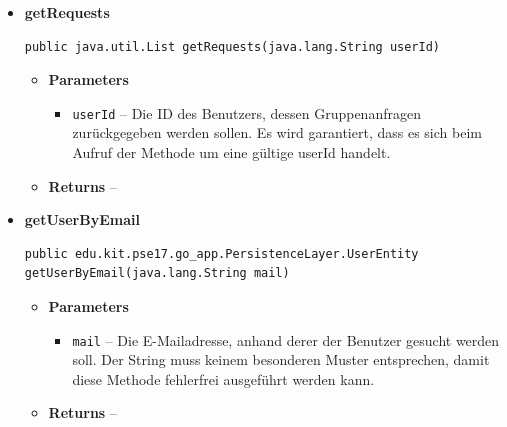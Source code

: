 \documentclass[11pt,a4paper]{article}
\begin{document}
{{{{{{{{{{{{{{{\begin{itemize}
{\begin{itemize}
{}%
\end{itemize}
}%
\item{ 
\hypertarget{edu.kit.pse17.go_app.PersistenceLayer.daos.UserDaoImp.getRequests(java.lang.String)}{{\bf  getRequests}\\}
\begin{lstlisting}[frame=none]
public java.util.List getRequests(java.lang.String userId)\end{lstlisting} %
\begin{itemize}
\item{
{\bf  Parameters}
  \begin{itemize}
   \item{
\texttt{userId} -- Die ID des Benutzers, dessen Gruppenanfragen zurückgegeben werden sollen. Es wird garantiert, dass es sich beim Aufruf der Methode um eine gültige userId handelt.}
  \end{itemize}
}%
\item{{\bf  Returns} -- 
 
}%
\end{itemize}
}%
\item{ 
\hypertarget{edu.kit.pse17.go_app.PersistenceLayer.daos.UserDaoImp.getUserByEmail(java.lang.String)}{{\bf  getUserByEmail}\\}
\begin{lstlisting}[frame=none]
public edu.kit.pse17.go_app.PersistenceLayer.UserEntity getUserByEmail(java.lang.String mail)\end{lstlisting} %
\begin{itemize}
\item{
{\bf  Parameters}
  \begin{itemize}
   \item{
\texttt{mail} -- Die E-Mailadresse, anhand derer der Benutzer gesucht werden soll. Der String muss keinem besonderen Muster entsprechen, damit diese Methode fehlerfrei ausgeführt werden kann.}
  \end{itemize}
}%
\item{{\bf  Returns} -- 
 
}
\end{itemize}}
\end{itemize}}}}}}}}}}}}}}}}
\end{document}
